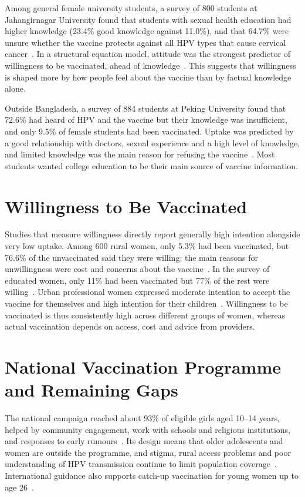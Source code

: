 Among general female university students, a survey of 800 students at Jahangirnagar University found that students with sexual health education had higher knowledge (23.4\% good knowledge against 11.0\%), and that 64.7\% were unsure whether the vaccine protects against all HPV types that cause cervical cancer~\cite{emon2025}. In a structural equation model, attitude was the strongest predictor of willingness to be vaccinated, ahead of knowledge~\cite{emon2025}. This suggests that willingness is shaped more by how people feel about the vaccine than by factual knowledge alone.

Outside Bangladesh, a survey of 884 students at Peking University found that 72.6\% had heard of HPV and the vaccine but their knowledge was insufficient, and only 9.5\% of female students had been vaccinated. Uptake was predicted by a good relationship with doctors, sexual experience and a high level of knowledge, and limited knowledge was the main reason for refusing the vaccine~\cite{liu2020}. Most students wanted college education to be their main source of vaccine information.

\section{Willingness to Be Vaccinated}
Studies that measure willingness directly report generally high intention alongside very low uptake. Among 600 rural women, only 5.3\% had been vaccinated, but 76.6\% of the unvaccinated said they were willing; the main reasons for unwillingness were cost and concerns about the vaccine~\cite{banik2022}. In the survey of educated women, only 11\% had been vaccinated but 77\% of the rest were willing~\cite{taniya2023}. Urban professional women expressed moderate intention to accept the vaccine for themselves and high intention for their children~\cite{bhuiyan2018}. Willingness to be vaccinated is thus consistently high across different groups of women, whereas actual vaccination depends on access, cost and advice from providers.

\section{National Vaccination Programme and Remaining Gaps}
The national campaign reached about 93\% of eligible girls aged 10--14 years, helped by community engagement, work with schools and religious institutions, and responses to early rumours~\cite{dhakatribune2024,gavi2023,unbd2024}. Its design means that older adolescents and women are outside the programme, and stigma, rural access problems and poor understanding of HPV transmission continue to limit population coverage~\cite{salauddin2025}. International guidance also supports catch-up vaccination for young women up to age 26~\cite{markowitz2014}.

